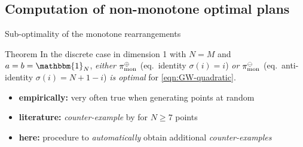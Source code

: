 \documentclass[9pt,xcolor={dvipsnames}]{beamer}
\begin{document}
\subsection{Computation of non-monotone optimal plans}
\begin{frame}{Sub-optimality of the monotone rearrangements}
    \begin{block}{Theorem \cite{vayer2020contribution}}
        In the discrete case in dimension 1 with $N=M$ and $a=b=\mathbbm{1}_N$, \emph{either $\pi_\text{mon}^\oplus$} (eq.~identity $\sigma(i)=i$) \emph{or $\pi_\text{mon}^\ominus$} (eq.~anti-identity $\sigma(i)=N+1-i$) \emph{is optimal} for \cref{eqn:GW-quadratic}.
    \end{block}
\begin{itemize}
    \item \textbf{empirically:} very often true when generating points at random
    \item \textbf{literature:} \emph{counter-example} by \cite{beinert2022assignment} for $N\geq 7$ points
    \item \textbf{here:} procedure to \emph{automatically} obtain additional \emph{counter-examples}
\end{itemize}
\pause
\begin{columns}
    \begin{column}[b]{.3\linewidth}
        
        \vspace{-8mm}
    \end{column}
    \begin{column}[b]{.3\linewidth}
        
        \vspace{-8mm}
    \end{column}
    \begin{column}[b]{.3\linewidth}
        \centering
        
        \vspace{-8mm}
    \end{column}
\end{columns}

\end{frame}
\end{document}
